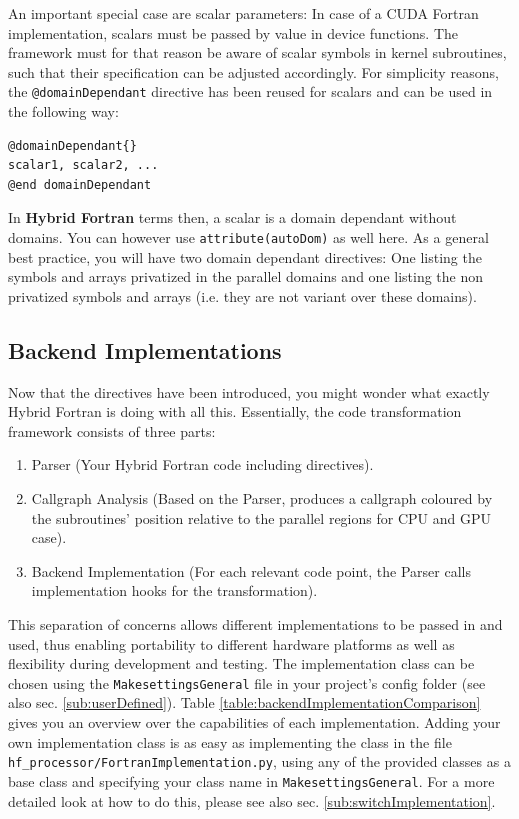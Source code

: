 An important special case are scalar parameters: In case of a CUDA Fortran implementation, scalars must be passed by value in device functions. The framework must for that reason be aware of scalar symbols in kernel subroutines, such that their specification can be adjusted accordingly. For simplicity reasons, the \verb|@domainDependant| directive has been reused for scalars and can be used in the following way:

\begin{lstlisting}[name=domainDependantScalar, label=listing:domainDependantScalar, caption={Domain dependant directive syntax for scalars.}]
@domainDependant{}
scalar1, scalar2, ...
@end domainDependant
\end{lstlisting}

In \textbf{Hybrid Fortran} terms then, a scalar is a domain dependant without domains. You can however use \verb|attribute(autoDom)| as well here. As a general best practice, you will have two domain dependant directives: One listing the symbols and arrays privatized in the parallel domains and one listing the non privatized symbols and arrays (i.e. they are not variant over these domains).

\subsection{Backend Implementations} \label{sub:backendImplementation}

 Now that the directives have been introduced, you might wonder what exactly Hybrid Fortran is doing with all this. Essentially, the code transformation framework consists of three parts:

 \begin{enumerate}
  \item Parser (Your Hybrid Fortran code including directives).
  \item Callgraph Analysis (Based on the Parser, produces a callgraph coloured by the subroutines' position relative to the parallel regions for CPU and GPU case).
  \item Backend Implementation (For each relevant code point, the Parser calls implementation hooks for the transformation).
 \end{enumerate}
 
 This separation of concerns allows different implementations to be passed in and used, thus enabling portability to different hardware platforms as well as flexibility during development and testing. The implementation class can be chosen using the \verb|MakesettingsGeneral| file in your project's config folder (see also sec. \ref{sub:userDefined}). Table \ref{table:backendImplementationComparison} gives you an overview over the capabilities of each implementation. Adding your own implementation class is as easy as implementing the class in the file \verb|hf_processor/FortranImplementation.py|, using any of the provided classes as a base class and specifying your class name in \verb|MakesettingsGeneral|. For a more detailed look at how to do this, please see also sec. \ref{sub:switchImplementation}.

